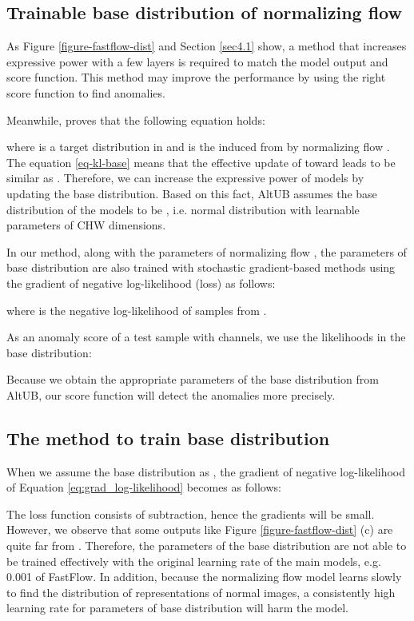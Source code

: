 \documentclass[letterpaper]{article}
\begin{document}
\subsection{Trainable base distribution of normalizing flow}
As Figure \ref{figure-fastflow-dist} and Section \ref{sec4.1} show, a method that increases expressive power with a few layers is required to match the model output and score function. This method may improve the performance by using the right score function to find anomalies.

Meanwhile, \cite{mask-auto} proves that the following equation holds:

where  is a target distribution in  and  is the induced from  by normalizing flow . The equation \ref{eq-kl-base} means that the effective update of  toward  leads  to be similar as . Therefore, we can increase the expressive power of models by updating the base distribution. Based on this fact, AltUB assumes the base distribution of the models to be , i.e. normal distribution with learnable parameters of CHW dimensions.

In our method, along with the parameters of normalizing flow , the parameters of base distribution  are also trained with stochastic gradient-based methods using the gradient of negative log-likelihood (loss) as follows: \small

\normalsize
where  is the negative log-likelihood of samples from .

As an anomaly score of a test sample with  channels, we use the likelihoods in the base distribution: \small

\normalsize
Because we obtain the appropriate parameters of the base distribution from AltUB, our score function will detect the anomalies more precisely.

\subsection{The method to train base distribution}
When we assume the base distribution as , the gradient of negative log-likelihood of Equation \ref{eq:grad_log-likelihood} becomes as follows: \small

\normalsize
The loss function consists of subtraction, hence the gradients will be small. However, we observe that some outputs like Figure \ref{figure-fastflow-dist} (c) are quite far from . Therefore, the parameters of the base distribution are not able to be trained effectively with the original learning rate of the main models, e.g. 0.001 of FastFlow. In addition, because the normalizing flow model learns slowly to find the distribution of representations of normal images, 
a consistently high learning rate for parameters of base distribution will harm the model.
\end{document}

